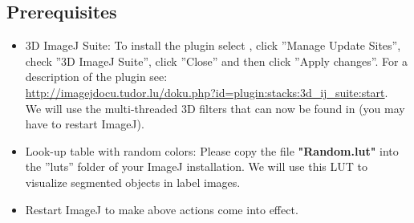\subsection{Prerequisites}
\label{sec:mod8prereq}

\begin{itemize}
\item 3D ImageJ Suite: To install the plugin select , click ''Manage Update Sites'', check ''3D ImageJ Suite'', click ''Close'' and then click ''Apply changes''.
For a description of the plugin see:\\
\url{http://imagejdocu.tudor.lu/doku.php?id=plugin:stacks:3d\_ij\_suite:start}.\\
We will use the multi-threaded 3D filters that can now be found in  (you may have to restart ImageJ).\\

\item Look-up table with random colors: Please copy the file \textbf{"Random.lut"} into the ''luts'' folder of your ImageJ installation. We will use this LUT to visualize segmented objects in label images.

\item Restart ImageJ to make above actions come into effect.
\end{itemize}